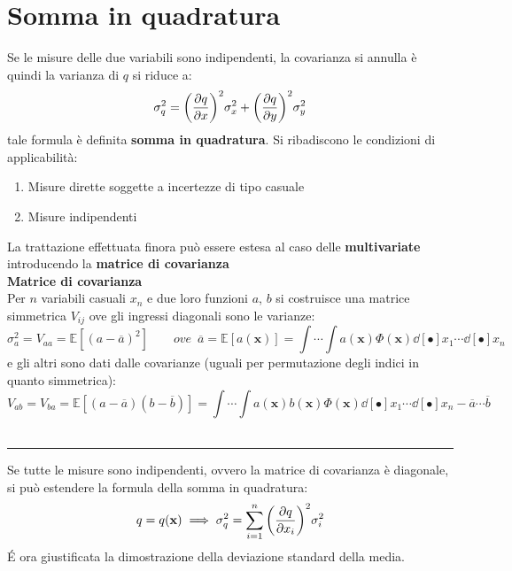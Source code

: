 \documentclass[10pt, oneside]{book}
\newcommand{\infobox}[2]{\vspace{0.5cm}~\\ \textbf{#1} \hrulefill \vspace{0.2cm}\\#2 {}\,\\\hrule \vspace{0.5cm}}
\begin{document}
\section{Somma in quadratura}
Se le misure delle due variabili sono indipendenti, la covarianza si annulla è quindi la varianza di $q$ si riduce a:
\[\sigma_q^2 = \bigg(\pdv{q}{x}\bigg)^2 \sigma_x^2 + \bigg(\pdv{q}{y}\bigg)^2 \sigma_y^2 \]
tale formula è definita \textbf{somma in quadratura}. Si ribadiscono le condizioni di applicabilità:
\begin{enumerate}
\item Misure dirette soggette a incertezze di tipo casuale
\item Misure indipendenti
\end{enumerate}
La trattazione effettuata finora può essere estesa al caso delle \textbf{multivariate} introducendo la \textbf{matrice di covarianza}
\infobox{Matrice di covarianza}{
Per $n$ variabili casuali $x_n$ e due loro funzioni $a$, $b$ si costruisce una matrice simmetrica $V_{ij}$ ove gli ingressi diagonali sono le varianze:
\[\sigma_a^2 = V_{aa} = \mathbb{E}[(a - \overline{a})^2] \qquad ove \enspace \overline{a} = \mathbb{E}[a(\mathbf{x})] = \int \cdots \int a(\mathbf{x}) \Phi(\mathbf{x}) \dd[•]{x_1} \cdots \dd[•]{x_n}\]
e gli altri sono dati dalle covarianze (uguali per permutazione degli indici in quanto simmetrica):
\[V_{ab} = V_{ba} = \mathbb{E}[(a - \overline{a}) (b - \overline{b})] = \int \cdots \int a(\mathbf{x}) b(\mathbf{x})\Phi(\mathbf{x}) \dd[•]{x_1} \cdots \dd[•]{x_n} - \overline{a} \cdots \overline{b}\]
}
Se tutte le misure sono indipendenti, ovvero la matrice di covarianza è diagonale, si può estendere la formula della somma in quadratura:
\[q = q(\mathbf{x}) \implies \sigma_q^2 = \sum\limits_{i=1}^n \bigg(\pdv{q}{x_i}\bigg)^2 \sigma_{i}^2\]
\'E ora giustificata la dimostrazione della deviazione standard della media.
\end{document}
